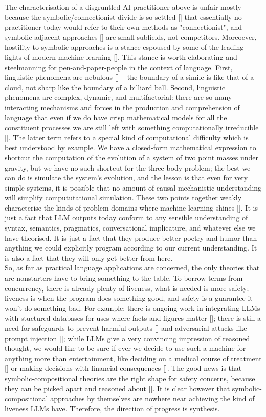 The characterisation of a disgruntled AI-practitioner above is unfair mostly because the symbolic/connectionist divide is so settled [] that essentially no practitioner today would refer to their own methods as "connectionist", and symbolic-adjacent approaches [] are small subfields, not competitors. Moreoever, hostility to symbolic approaches is a stance espoused by some of the leading lights of modern machine learning []. This stance is worth elaborating and steelmanning for pen-and-paper-people in the context of language. First, linguistic phenomena are nebulous [] -- the boundary of a simile is like that of a cloud, not sharp like the boundary of a billiard ball. Second, linguistic phenomena are complex, dynamic, and multifactorial: there are so many interacting mechanisms and forces in the production and comprehension of language that even if we do have crisp mathematical models for all the constituent processes we are still left with something computationally irreducible []. The latter term refers to a special kind of computational difficulty which is best understood by example. We have a closed-form mathematical expression to shortcut the computation of the evolution of a system of two point masses under gravity, but we have no such shortcut for the three-body problem; the best we can do is simulate the system's evolution, and the lesson is that even for very simple systems, it is possible that no amount of causal-mechanistic understanding will simplify compututational simulation. These two points together weakly characterise the kinds of problem domains where machine learning shines []. It is just a fact that LLM outputs today conform to any sensible understanding of syntax, semantics, pragmatics, conversational implicature, and whatever else we have theorised. It is just a fact that they produce better poetry and humor than anything we could explicitly program according to our current understanding. It is also a fact that they will only get better from here.\\

So, as far as practical language applications are concerned, the only theories that are nonstarters have to bring something to the table. To borrow terms from concurrency, there is already plenty of liveness, what is needed is more safety; liveness is when the program does something good, and safety is a guarantee it won't do something bad. For example; there is ongoing work in integrating LLMs with stuctured databases for uses where facts and figures matter []; there is still a need for safeguards to prevent harmful outputs [] and adversarial attacks like prompt injection []; while LLMs give a very convincing impression of reasoned thought, we would like to be sure if ever we decide to use such a machine for anything more than entertainment, like deciding on a medical course of treatment [] or making decisions with financial consequences []. The good news is that symbolic-compositional theories are the right shape for safety concerns, because they can be picked apart and reasoned about []. It is clear however that symbolic-compositional approaches by themselves are nowhere near achieving the kind of liveness LLMs have. Therefore, the direction of progress is synthesis.\\

